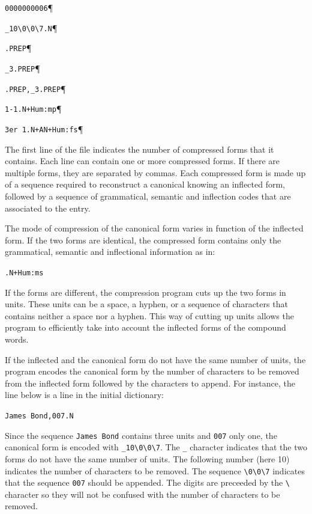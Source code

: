 \bigskip
\verb$0000000006$\P

\verb$_10\0\0\7.N$\P

\verb$.PREP$\P

\verb$_3.PREP$\P

\verb$.PREP,_3.PREP$\P

\verb$1-1.N+Hum:mp$\P

\verb$3er 1.N+AN+Hum:fs$\P

\bigskip
\noindent The first line of the file indicates the number of compressed forms that
it contains. Each line can contain one or more compressed forms. If there are
multiple forms, they are separated by commas. Each compressed form is made up of
a sequence required to reconstruct a canonical knowing an inflected form,
followed by a sequence of grammatical, semantic and inflection codes that are
associated to the entry.

\bigskip
\noindent The mode of compression of the canonical form varies in function of the
inflected form. If the two forms are identical, the compressed form contains only
the grammatical, semantic and inflectional information as in:

\bigskip
\verb$.N+Hum:ms$

\bigskip
\noindent If the forms are different, the compression program cuts up the two
forms in units. These units can be a space, a hyphen, or a sequence of characters
that contains neither a space nor a hyphen. This way of cutting up units allows
the program to efficiently take into account the inflected forms of the compound
words.

\bigskip
\noindent If the inflected and the canonical form do not have the same number of
units, the program encodes the canonical form by the number of characters to be
removed from the inflected form followed by the characters to append. For
instance, the line below is a line in the initial dictionary:

\bigskip
\verb+James Bond,007.N+

\bigskip
\noindent Since the sequence \verb+James Bond+ contains three units and \verb+007+ only
one, the canonical form is encoded with \verb+_10\0\0\7+. The \verb+_+ character
indicates that the two forms do not have the same number of units. The following
number (here 10) indicates the number of characters to be removed. The sequence
\verb+\0\0\7+ indicates that the sequence \verb+007+ should be appended. The
digits are preceeded by the \verb+\+ character so they will not be confused with
the number of characters to be removed.

